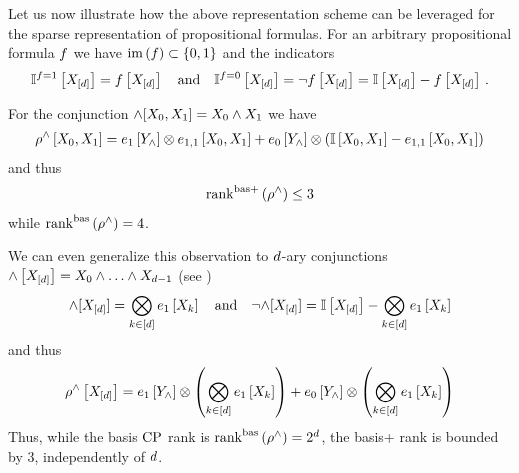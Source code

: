 \begin{example}
    Let us now illustrate how the above representation scheme can be leveraged for the sparse representation of propositional formulas.
    For an arbitrary propositional formula $f$ we have $\mathrm{im}\left(f\right)\subset\{0,1\}$ and the indicators
    \begin{align*}
        \mathbb{I}^{f=1}\left[X_{[d]}\right] = f\left[X_{[d]}\right] \quad \text{and} \quad
        \mathbb{I}^{f=0}\left[X_{[d]}\right] = \lnot f\left[X_{[d]}\right] = \mathbb{I}\left[X_{[d]}\right] - f\left[X_{[d]}\right] \, .
    \end{align*}

    For the conjunction $\land[X_{0},X_{1}] = X_{0} \land X_{1}$ we have
    \begin{align*}
        \rho^{\land}\left[X_{0},X_{1}\right]
        = e_1\left[Y_{\land}\right] \otimes e_{1,1}\left[X_{0},X_{1}\right]
        + e_0\left[Y_{\land}\right] \otimes (\mathbb{I}\left[X_{0},X_{1}\right] - e_{1,1}\left[X_{0},X_{1}\right])
    \end{align*}
    and thus
    \begin{align*}
        \mathrm{rank}^{\mathrm{bas+}}\left(\rho^{\land}\right) \leq 3
    \end{align*}
    while $\mathrm{rank}^{\mathrm{bas}}\left(\rho^{\land}\right) = 4$.

    We can even generalize this observation to $d$-ary conjunctions $\land\left[X_{[d]}\right]=X_{0}\land\ldots\land X_{d-1}$ (see )
    \begin{align*}
    {\land}[X_{[d]}]
        = \bigotimes_{k\in[d]} e_1\left[X_{k}\right]
        \quad \text{and} \quad
        {\lnot\land}[X_{[d]}] = \mathbb{I}\left[X_{[d]}\right] - \bigotimes_{k\in[d]} e_1\left[X_{k}\right]
    \end{align*}
    and thus
    \begin{align*}
        \rho^{\land}\left[X_{[d]}\right] =
        e_1\left[Y_{\land}\right] \otimes \left(\bigotimes_{k\in[d]} e_1\left[X_{k}\right]\right)
        + e_0\left[Y_{\land}\right] \otimes \left(\bigotimes_{k\in[d]} e_1\left[X_{k}\right]\right)
    \end{align*}
    Thus, while the basis $\mathrm{CP}$ rank is $\mathrm{rank}^{\mathrm{bas}}\left(\rho^{\land}\right)=2^{d}$, the basis+ rank is bounded by $3$, independently of $d$.
\end{example}







